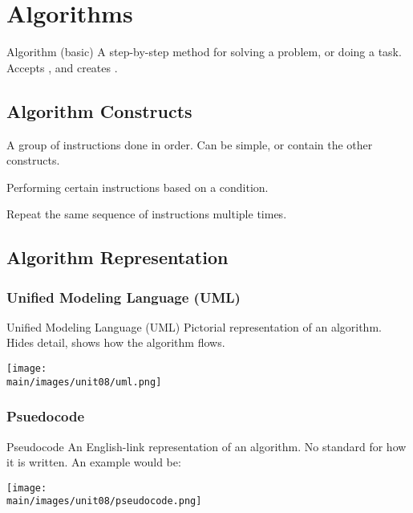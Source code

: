 \documentclass[\main/notes.tex]{subfiles}
\begin{document}
	\ifSubfilesClassLoaded{\setcounter{chapter}{7}}{}
	\chapter{Algorithms}
		\begin{definition}{Algorithm (basic)}
			A step-by-step method for solving a problem, or doing a task. Accepts , and creates .
		\end{definition}
		\section{Algorithm Constructs}
			\begin{description}[nosep]
				\item[Sequence] A group of instructions done in order. Can be simple, or contain the other constructs.
				\item[Decision] Performing certain instructions based on a condition.
				\item[Repetition] Repeat the same sequence of instructions multiple times.
			\end{description}
		\section{Algorithm Representation}
			\subsection{Unified Modeling Language (UML)}
				\begin{definition}{Unified Modeling Language (UML)}
					Pictorial representation of an algorithm. Hides detail, shows how the algorithm flows.
					\begin{center}
						\texttt{[image: \\main/images/unit08/uml.png]}
					\end{center}
				\end{definition}
			\subsection{Psuedocode}
				\begin{definition}{Pseudocode}
					An English-link representation of an algorithm. No standard for how it is written. An example would be:
					\begin{center}
						\texttt{[image: \\main/images/unit08/pseudocode.png]}
					\end{center}
				\end{definition}
\end{document}
